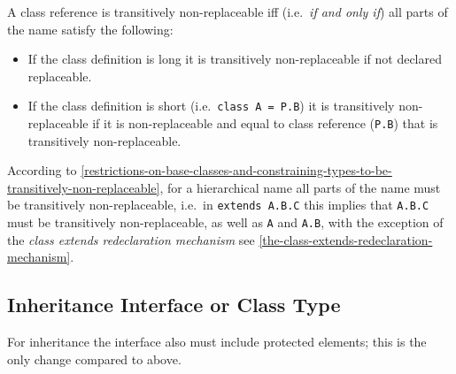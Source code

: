 A class reference is transitively non-replaceable iff (i.e.\ \emph{if and
only if}) all parts of the name satisfy the following:
\begin{itemize}
\item
  If the class definition is long it is transitively non-replaceable if
  not declared replaceable.
\item
  If the class definition is short (i.e.\ \lstinline!class A = P.B!) it is
  transitively non-replaceable if it is non-replaceable and equal to
  class reference (\lstinline!P.B!) that is transitively non-replaceable.
\end{itemize}

\begin{nonnormative}
According to \autoref{restrictions-on-base-classes-and-constraining-types-to-be-transitively-non-replaceable}, for a hierarchical name all
parts of the name must be transitively non-replaceable, i.e.\ in \lstinline!extends A.B.C! this implies that \lstinline!A.B.C! must be transitively
non-replaceable, as well as \lstinline!A! and \lstinline!A.B!, with the exception of the \emph{class
extends redeclaration mechanism} see \autoref{the-class-extends-redeclaration-mechanism}.
\end{nonnormative}

\subsection{Inheritance Interface or Class Type}

For inheritance the interface also must include protected elements; this
is the only change compared to above.

